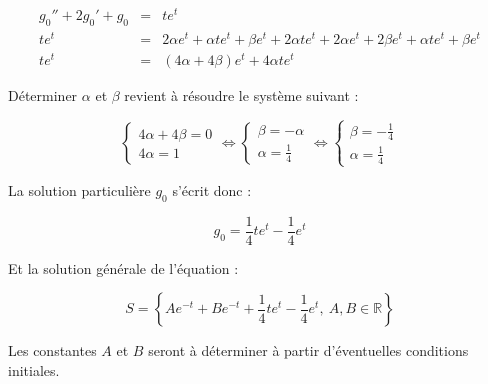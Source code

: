 \documentclass[a4paper, 11pt]{report} %
\newcommand{\R}{\mathbb{R}}
\begin{document}
\begin{eqnarray*}
g_0'' + 2g_0' + g_0 & = & te^t\\
te^t & = & 2\alpha e^t + \alpha t e^t + \beta e^t + 2\alpha t e^t + 2\alpha e^t + 2\beta e^t +\alpha t e^t + \beta e^t\\
te^t & = &(4\alpha + 4\beta) e^t + 4\alpha t e^t
\end{eqnarray*}

Déterminer $\alpha$ et $\beta$ revient à résoudre le système suivant :

\[
\left\{
\begin{array}{l}
4\alpha + 4\beta = 0\\
4\alpha = 1
\end{array}
\right.
\Leftrightarrow
\left\{
\begin{array}{l}
\beta = -\alpha\\
\alpha = \frac{1}{4}
\end{array}
\right.
\Leftrightarrow
\left\{
\begin{array}{l}
\beta = -\frac{1}{4}\\
\alpha = \frac{1}{4}
\end{array}
\right.
\]

La solution particulière $g_0$ s'écrit donc :

\[ g_0 = \frac{1}{4}te^t - \frac{1}{4}e^t \]

Et la solution générale de l'équation :

\[
S = \left\{Ae^{-t} + Be^{-t} +\frac{1}{4}te^t - \frac{1}{4}e^t,~A,B\in\R\right\}
\]

Les constantes $A$ et $B$ seront à déterminer à partir d'éventuelles conditions initiales.

\end{document}
